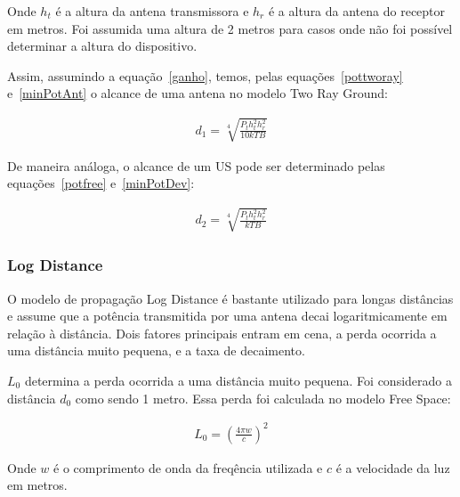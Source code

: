Onde \begin{math}h_t\end{math} é a altura da antena transmissora e \begin{math}h_r\end{math} é a altura da antena do receptor em metros. Foi assumida uma altura de 2 metros para casos onde não foi possível determinar a altura do dispositivo.

Assim, assumindo a equação~\ref{ganho}, temos, pelas equações~\ref{pottworay} e~\ref{minPotAnt} o alcance de uma antena no modelo Two Ray Ground:

\begin{align}
  \label{dTwoRayAnt} d_1 = \sqrt[4]{\frac{P_th_t^{2}h_r^{2}}{10kTB}}
\end{align}

De maneira análoga, o alcance de um US pode ser determinado pelas equações~\ref{potfree} e~\ref{minPotDev}:

\begin{align}
  \label{dTwoRayDev} d_2 = \sqrt[4]{\frac{P_th_t^{2}h_r^{2}}{kTB}}
\end{align}


\subsubsection{Log Distance}

O modelo de propagação Log Distance é bastante utilizado para longas distâncias e assume que a potência transmitida por uma antena decai logaritmicamente em relação à distância. Dois fatores principais entram em cena, a perda ocorrida a uma distância muito pequena, e a taxa de decaimento.

\begin{math}L_0\end{math} determina a perda ocorrida a uma distância muito pequena. Foi considerado a distância \begin{math}d_0\end{math} como sendo 1 metro. Essa perda foi calculada no modelo Free Space:

\begin{align}
  \label{L0} L_0 = \left( \frac{4\pi w}{c}\right)^{2}
\end{align}

Onde \begin{math}w\end{math} é o comprimento de onda da freqência utilizada e \begin{math}c\end{math} é a velocidade da luz em metros.

